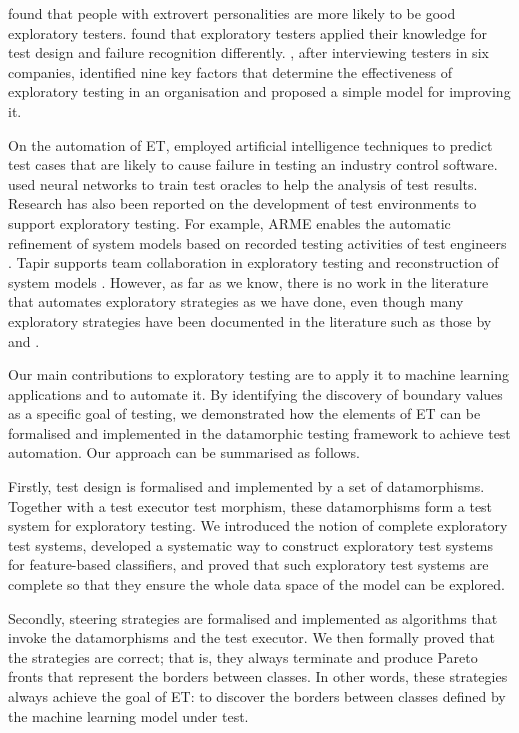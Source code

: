 \documentclass[preprint,1p,authoryear,times]{elsarticle}
\begin{document}
\citet{Shoaib_et_al2009} found that people with extrovert personalities are more likely to be good exploratory testers. \citet{Itkonen_et_al2013} found that exploratory testers applied their knowledge for test design and failure recognition differently. \citet{Martensson_et_al2021}, after interviewing testers in six companies, identified nine key factors that determine the effectiveness of exploratory testing in an organisation and proposed a simple model for improving it.

On the automation of ET, \citet{Eidenbenz_et_al2021} employed artificial intelligence techniques to predict test cases that are likely to cause failure in testing an industry control software. \citet{Makondo_et_al2016} used neural networks to train test oracles to help the analysis of test results. Research has also been reported on the development of test environments to support exploratory testing. For example, ARME enables the automatic refinement of system models based on recorded testing activities of test engineers \citep{GebizliAndSozer2016}. Tapir supports team collaboration in exploratory testing and reconstruction of system models \citep{Bures_et_al2018}. However, as far as we know, there is no work in the literature that automates exploratory strategies as we have done, even though many exploratory strategies have been documented in the literature such as those by \citet{whittaker2009exploratory} and \citet{Hendrickson2013}. 

Our main contributions to exploratory testing are to apply it to machine learning applications and to automate it. By identifying the discovery of boundary values as a specific goal of testing, we demonstrated how the elements of ET can be formalised and implemented in the datamorphic testing framework to achieve test automation. Our approach can be summarised as follows.

Firstly, test design is formalised and implemented by a set of datamorphisms. Together with a test executor test morphism, these datamorphisms form a test system for exploratory testing. We introduced the notion of complete exploratory test systems, developed a systematic way to construct exploratory test systems for feature-based classifiers, and proved that such exploratory test systems are complete so that they ensure the whole data space of the model can be explored. 

Secondly, steering strategies are formalised and implemented as algorithms that invoke the datamorphisms and the test executor. We then formally proved that the strategies are correct; that is, they always terminate and produce Pareto fronts that represent the borders between classes. In other words, these strategies always achieve the goal of ET: to discover the borders between classes defined by the machine learning model under test. 
\end{document}
